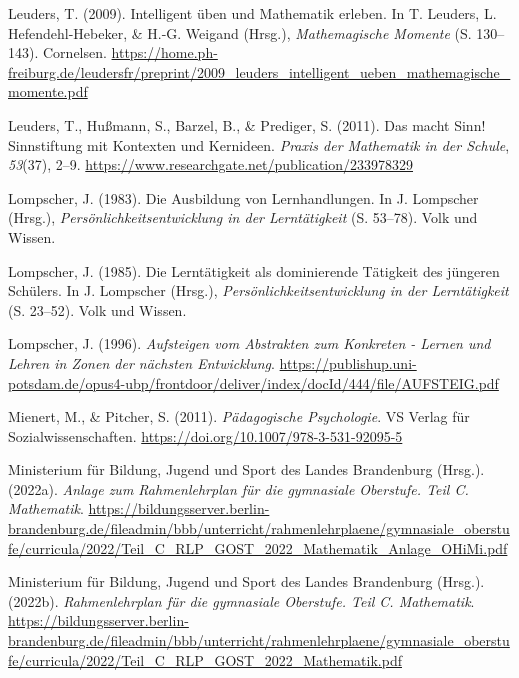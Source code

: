 \documentclass[
]{scrbook}
\newlength{\cslhangindent}
\newenvironment{CSLReferences}[2] %
 {\begin{list}{}{%
  \setlength{\itemindent}{0pt}
  \setlength{\leftmargin}{0pt}
  \setlength{\parsep}{0pt}
  \ifodd #1
   \setlength{\leftmargin}{\cslhangindent}
   \setlength{\itemindent}{-1\cslhangindent}
  \fi
  \setlength{\itemsep}{#2\baselineskip}}}
 {\end{list}}
\theoremstyle{definition}
\theoremstyle{definition}
\theoremstyle{definition}
\theoremstyle{definition}
\theoremstyle{remark}
\begin{document}
\begin{CSLReferences}{1}{0}
Leuders, T. (2009). Intelligent üben und {Mathematik} erleben. In T. Leuders, L. Hefendehl-Hebeker, \& H.-G. Weigand (Hrsg.), \emph{Mathemagische {Momente}} (S. 130--143). Cornelsen. \url{https://home.ph-freiburg.de/leudersfr/preprint/2009_leuders_intelligent_ueben_mathemagische_momente.pdf}

Leuders, T., Hußmann, S., Barzel, B., \& Prediger, S. (2011). Das macht {Sinn}! {Sinnstiftung} mit {Kontexten} und {Kernideen}. \emph{Praxis der Mathematik in der Schule}, \emph{53}(37), 2--9. \url{https://www.researchgate.net/publication/233978329}

Lompscher, J. (1983). Die {Ausbildung} von {Lernhandlungen}. In J. Lompscher (Hrsg.), \emph{Persönlichkeitsentwicklung in der {Lerntätigkeit}} (S. 53--78). Volk und Wissen.

Lompscher, J. (1985). Die {Lerntätigkeit} als dominierende {Tätigkeit} des jüngeren {Schülers}. In J. Lompscher (Hrsg.), \emph{Persönlichkeitsentwicklung in der {Lerntätigkeit}} (S. 23--52). Volk und Wissen.

Lompscher, J. (1996). \emph{Aufsteigen vom {Abstrakten} zum {Konkreten} - {Lernen} und {Lehren} in {Zonen} der nächsten {Entwicklung}}. \url{https://publishup.uni-potsdam.de/opus4-ubp/frontdoor/deliver/index/docId/444/file/AUFSTEIG.pdf}

Mienert, M., \& Pitcher, S. (2011). \emph{Pädagogische {Psychologie}}. VS Verlag für Sozialwissenschaften. \url{https://doi.org/10.1007/978-3-531-92095-5}

Ministerium für Bildung, Jugend und Sport des Landes Brandenburg (Hrsg.). (2022a). \emph{Anlage zum {Rahmenlehrplan} für die gymnasiale {Oberstufe}. {Teil} {C}. {Mathematik}}. \url{https://bildungsserver.berlin-brandenburg.de/fileadmin/bbb/unterricht/rahmenlehrplaene/gymnasiale_oberstufe/curricula/2022/Teil_C_RLP_GOST_2022_Mathematik_Anlage_OHiMi.pdf}

Ministerium für Bildung, Jugend und Sport des Landes Brandenburg (Hrsg.). (2022b). \emph{Rahmenlehrplan für die gymnasiale {Oberstufe}. {Teil} {C}. {Mathematik}}. \url{https://bildungsserver.berlin-brandenburg.de/fileadmin/bbb/unterricht/rahmenlehrplaene/gymnasiale_oberstufe/curricula/2022/Teil_C_RLP_GOST_2022_Mathematik.pdf}


\end{CSLReferences}
\end{document}
